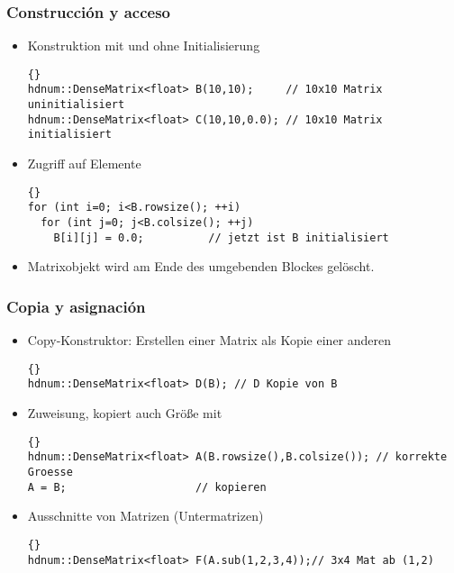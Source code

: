 \documentclass[a4paper,11pt]{article}
\theoremstyle{definition}
\begin{document}
\begin{frame}[fragile]
\frametitle{Construcción y acceso}
\begin{itemize}
\item Konstruktion mit und ohne Initialisierung\\
{\footnotesize{\begin{lstlisting}{}
hdnum::DenseMatrix<float> B(10,10);     // 10x10 Matrix uninitialisiert
hdnum::DenseMatrix<float> C(10,10,0.0); // 10x10 Matrix initialisiert
\end{lstlisting}}}
\item Zugriff auf Elemente\\
{\footnotesize{\begin{lstlisting}{}
for (int i=0; i<B.rowsize(); ++i)
  for (int j=0; j<B.colsize(); ++j)
    B[i][j] = 0.0;          // jetzt ist B initialisiert
\end{lstlisting}}}
\item Matrixobjekt wird am Ende des umgebenden Blockes gelöscht.
\end{itemize}
\end{frame}

\begin{frame}[fragile]
\frametitle{Copia y asignación}
\begin{itemize}
\item Copy-Konstruktor: Erstellen einer Matrix als Kopie einer anderen
{\footnotesize{\begin{lstlisting}{}
hdnum::DenseMatrix<float> D(B); // D Kopie von B
\end{lstlisting}}}
\item Zuweisung, kopiert auch Größe mit
{\footnotesize{\begin{lstlisting}{}
hdnum::DenseMatrix<float> A(B.rowsize(),B.colsize()); // korrekte Groesse
A = B;                    // kopieren
\end{lstlisting}}}
\item Ausschnitte von Matrizen (Untermatrizen)\\
{\footnotesize{\begin{lstlisting}{}
hdnum::DenseMatrix<float> F(A.sub(1,2,3,4));// 3x4 Mat ab (1,2)
\end{lstlisting}}}
\end{itemize}
\end{frame}
\end{document}
